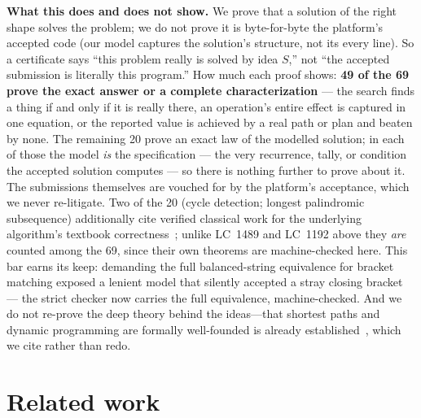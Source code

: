 \documentclass[11pt]{article}
\begin{document}
\textbf{What this does and does not show.} We prove that a solution of the right shape solves the problem; we
do not prove it is byte-for-byte the platform's accepted code (our model captures the solution's structure,
not its every line). So a certificate says ``this problem really is solved by idea $S$,'' not ``the accepted
submission is literally this program.'' How much each proof shows: \textbf{49 of the 69 prove the
exact answer or a complete
characterization} --- the search finds a thing if and only if it is really there, an operation's
entire effect is captured in one equation, or the reported value is achieved by a real path or
plan and beaten by none. The remaining 20 prove an exact law of the modelled solution; in each
of those the model \emph{is} the specification --- the very recurrence, tally, or condition the
accepted solution computes --- so there is nothing further to prove about it. The submissions
themselves are vouched for by the platform's acceptance, which we never re-litigate. Two of the 20 (cycle detection; longest palindromic subsequence) additionally cite verified
classical work for the underlying algorithm's textbook
correctness~\cite{afp_tortoisehare,afp_dp}; unlike LC~1489 and LC~1192 above they \emph{are}
counted among the 69, since their own theorems are machine-checked here. This bar earns its keep: demanding the full
balanced-string equivalence for bracket matching exposed a lenient model that silently accepted a stray
closing bracket --- the strict checker now carries the full equivalence, machine-checked. And we do not
re-prove the deep theory behind the ideas---that shortest paths and dynamic programming are formally
well-founded is already established~\cite{afp_dijkstra,afp_kleene,lehmann77,afp_dp}, which we cite rather than
redo.

\section{Related work}
\label{sec:related}
\end{document}
